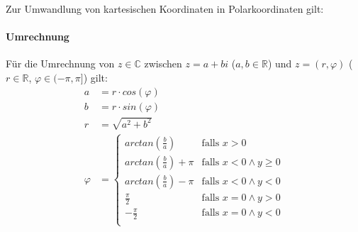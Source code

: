                 Zur Umwandlung von kartesischen Koordinaten in Polarkoordinaten gilt:

            \paragraph{Umrechnung}
                Für die Umrechnung von $ z \in \mathbb{C} $ zwischen $ z = a + bi $ ($ a, b \in \mathbb{R} $) und $ z = (r, \varphi) $ ($ r \in \mathbb{R} $, $ \varphi \in (-\pi, \pi] $) gilt:
                \begin{align*}
                    a &= r \cdot cos(\varphi) \\
                    b &= r \cdot sin(\varphi) \\
                    r &= \sqrt{a ^ 2 + b ^ 2} \\
                    \varphi &=
                    \begin{cases}
                        arctan(\frac{b}{a}) & \text{falls } x > 0 \\
                        arctan(\frac{b}{a}) + \pi & \text{falls } x < 0 \land y \geq 0 \\
                        arctan(\frac{b}{a}) - \pi & \text{falls } x < 0 \land y < 0 \\
                        \frac{\pi}{2} & \text{falls } x = 0 \land y > 0 \\
                        -\frac{\pi}{2} & \text{falls } x = 0 \land y < 0 \\
                    \end{cases}
                \end{align*}
